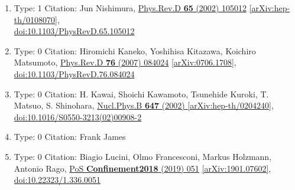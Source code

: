 \documentclass[a4paper,10pt]{article}
\begin{document}
\begin{enumerate}
\begin{enumerate}
  \item Type: 1 Citation: Jun Nishimura, \href{https://www.doi.org/10.1103/PhysRevD.65.105012}{Phys.Rev.D {\bf 65} (2002) 105012}  \href{https://arxiv.org/abs/hep-th/0108070}{[arXiv:hep-th/0108070]},\\\href{https://www.doi.org/10.1103/PhysRevD.65.105012}{doi:10.1103/PhysRevD.65.105012}
  \item Type: 0 Citation: Hiromichi Kaneko, Yoshihisa Kitazawa, Koichiro Matsumoto, \href{https://www.doi.org/10.1103/PhysRevD.76.084024}{Phys.Rev.D {\bf 76} (2007) 084024}  \href{https://arxiv.org/abs/0706.1708}{[arXiv:0706.1708]},\\\href{https://www.doi.org/10.1103/PhysRevD.76.084024}{doi:10.1103/PhysRevD.76.084024}
  \item Type: 0 Citation: H. Kawai, Shoichi Kawamoto, Tsunehide Kuroki, T. Matsuo, S. Shinohara, \href{https://www.doi.org/10.1016/S0550-3213(02)00908-2}{Nucl.Phys.B {\bf 647} (2002) }  \href{https://arxiv.org/abs/hep-th/0204240}{[arXiv:hep-th/0204240]},\\\href{https://www.doi.org/10.1016/S0550-3213(02)00908-2}{doi:10.1016/S0550-3213(02)00908-2}
  \item Type: 0 Citation: Frank James
  \item Type: 0 Citation: Biagio Lucini, Olmo Francesconi, Markus Holzmann, Antonio Rago, \href{https://www.doi.org/10.22323/1.336.0051}{PoS {\bf Confinement2018} (2019) 051}  \href{https://arxiv.org/abs/1901.07602}{[arXiv:1901.07602]},\\\href{https://www.doi.org/10.22323/1.336.0051}{doi:10.22323/1.336.0051}

\end{enumerate}
\end{enumerate}
\end{document}
